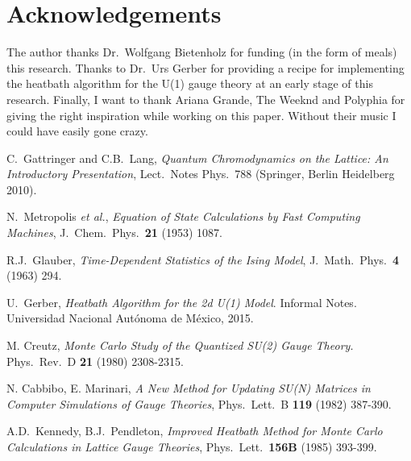 \documentclass[12pt,a4paper]{article}
\begin{document}
\section{Acknowledgements}
The author thanks Dr.\ Wolfgang Bietenholz for funding (in the form of meals) this research. Thanks to Dr.\ Urs Gerber for providing a recipe for implementing the heatbath algorithm for the U(1) gauge theory at an early stage of this research. Finally, I want to thank Ariana Grande, The Weeknd and Polyphia for giving the right inspiration while working on this paper. Without their music I could have easily gone crazy.


\begin{thebibliography}{99}

 C.\ Gattringer and C.B.\ Lang, \emph{Quantum Chromodynamics on the Lattice: An Introductory Presentation},  Lect.\ Notes Phys.\ 788 (Springer, Berlin Heidelberg 2010).

 N.\ Metropolis {\it et al.},
\emph{Equation of State Calculations by Fast Computing Machines},
J.\ Chem.\ Phys.\ {\bf 21} (1953) 1087.

 R.J.\ Glauber,
  \emph{Time-Dependent Statistics of the Ising Model},
  J.\ Math.\ Phys.\ {\bf 4} (1963) 294.
  
 U.\ Gerber,
  \emph{Heatbath Algorithm for the 2d U(1) Model}.
  Informal Notes. Universidad Nacional Autónoma de México, 2015.  
  
   M. Creutz, \emph{Monte Carlo Study of the Quantized SU(2) Gauge Theory.} Phys.\ Rev.\ D {\bf 21} (1980) 2308-2315.

 N. Cabbibo, E. Marinari, \emph{A New Method for Updating SU(N) Matrices in Computer Simulations of Gauge Theories}, Phys.\ Lett.\ B {\bf 119} (1982) 387-390.

 A.D.\ Kennedy, B.J.\ Pendleton, \emph{Improved Heatbath Method for Monte Carlo Calculations in Lattice Gauge Theories}, Phys.\ Lett.\ {\bf 156B} (1985) 393-399.
\end{thebibliography}
\end{document}
